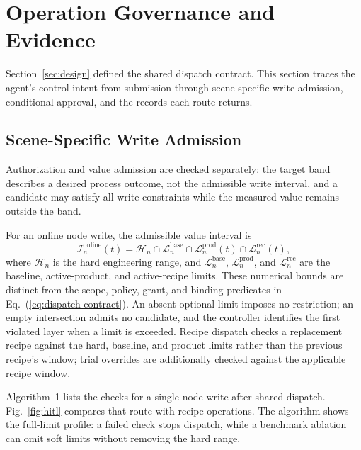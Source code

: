 \section{Operation Governance and Evidence}
\label{sec:modules}
Section~\ref{sec:design} defined the shared dispatch contract. This section traces the agent's control intent from submission through scene-specific write admission,
conditional approval, and the records each route returns.

\subsection{Scene-Specific Write Admission}
\label{sec:governed}
Authorization and value admission are checked separately: the target band describes a desired process outcome, not the admissible write interval, and a candidate may satisfy all write constraints while the measured value remains outside the band.

For an online node write, the admissible value interval is
\begin{equation}
\mathcal{I}^{\mathrm{online}}_n(t)=
\mathcal{H}_n\cap\mathcal{L}^{\mathrm{base}}_n\cap\mathcal{L}^{\mathrm{prod}}_n(t)\cap\mathcal{L}^{\mathrm{rec}}_n(t),
\label{eq:admission}
\end{equation}
where $\mathcal{H}_n$ is the hard engineering range, and
$\mathcal{L}^{\mathrm{base}}_n$, $\mathcal{L}^{\mathrm{prod}}_n$, and
$\mathcal{L}^{\mathrm{rec}}_n$ are the baseline, active-product, and
active-recipe limits. These numerical bounds are distinct from the scope,
policy, grant, and binding predicates in Eq.~(\ref{eq:dispatch-contract}).
An absent optional limit imposes no restriction; an empty intersection admits no candidate, and the controller identifies the first violated layer when a limit is exceeded. Recipe dispatch checks a replacement recipe against the hard, baseline, and product limits rather than the previous recipe's window; trial overrides are additionally checked against the applicable recipe window.

Algorithm~1 lists the checks for a single-node write after shared dispatch. Fig.~\ref{fig:hitl} compares that route with recipe operations. The algorithm shows the full-limit profile: a failed check stops dispatch, while a benchmark ablation can omit soft limits without removing the hard range.


